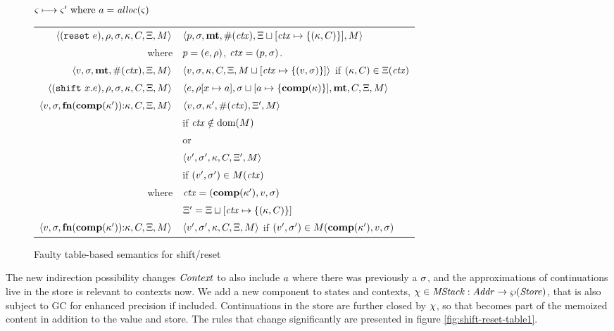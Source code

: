 \begin{figure*}
  \centering
  $\varsigma \longmapsto \varsigma' \text{ where } a = \mathit{alloc}(\varsigma)$ \\
  \begin{tabular}{r|l}
    \hline
    $\langle (\texttt{reset}\ e), \rho, \sigma, \kappa, C, \Xi, M \rangle$
    &
    $\langle p, \sigma, \mathbf{mt}, \#(\mathit{ctx}), \Xi\sqcup[\mathit{ctx} \mapsto \{ (\kappa,C) \}], M \rangle$
    \\
    where & $p = (e, \rho)$, $\mathit{ctx} = (p, \sigma)$.
    \\
    $\langle v, \sigma, \mathbf{mt}, \#(\mathit{ctx}), \Xi, M \rangle$
    &
    $\langle v, \sigma, {\kappa}, {C}, \Xi, M\sqcup[\mathit{ctx} \mapsto \{ (v,\sigma) \}] \rangle$
    if $(\kappa,C) \in \Xi(\mathit{ctx})$
    \\
    $\langle (\texttt{shift}\ x. e), \rho, \sigma, \kappa, C, \Xi, M \rangle$
    &
    $\langle e, \rho[x \mapsto a], \sigma\sqcup[a \mapsto \{ \mathbf{comp}(\kappa) \}],\mathbf{mt},C,\Xi,M \rangle$
    \\
    $\langle v,\sigma,\mathbf{fn}{}(\mathbf{comp}(\kappa')){\tt :} \kappa, C, \Xi, M \rangle$
    &
    $\langle v, \sigma, \kappa', \#(\mathit{ctx}), \Xi',M \rangle$
    \\ & \quad if $\mathit{ctx} \notin \text{dom}(M)$
    \\
    & or \\
    & $\langle v', \sigma', \kappa, C, \Xi',M \rangle$
    \\ & \quad if $(v',\sigma') \in M(\mathit{ctx})$
    \\
    where & $\mathit{ctx} = (\mathbf{comp}(\kappa'), v, \sigma)$ \\
          & $\Xi' = \Xi\sqcup[\mathit{ctx} \mapsto \{ (\kappa,C) \}]$
    \\
    $\langle v,\sigma,\mathbf{fn}{}(\mathbf{comp}(\kappa')){\tt :} \kappa, C, \Xi, M \rangle$
    &
    $\langle v', \sigma', \kappa, C, \Xi,M \rangle$ if $(v',\sigma') \in M(\mathbf{comp}(\kappa'),v,\sigma)$
  \end{tabular}  
  \caption{Faulty table-based semantics for shift/reset}
  \label{fig:shift-reset-table0}
\end{figure*}

The new indirection possibility changes $\mathit{Context}$ to also include $a$ where there was previously a $\sigma$, and the approximations of continuations live in the store is relevant to contexts now.
%
We add a new component to states and contexts, $\chi \in \mathit{MStack} : \mathit{Addr} \to \wp(\mathit{Store})$, that is also subject to GC for enhanced precision if included.
%
Continuations in the store are further closed by $\chi$, so that becomes part of the memoized content in addition to the value and store.
%
The rules that change significantly are presented in figure \ref{fig:shift-reset-table1}.

